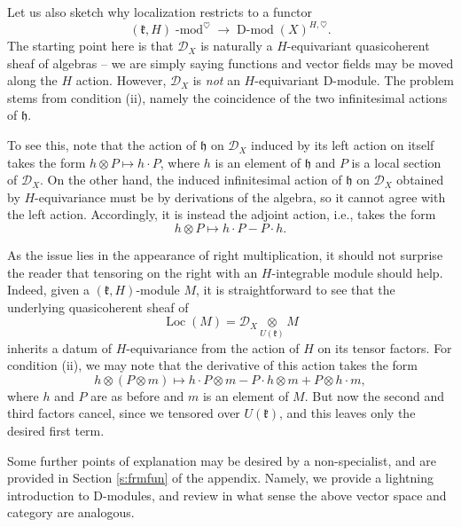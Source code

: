 \documentclass[10pt]{amsart}
\newcommand{\sB}{\on{Fl}_G}
\newcommand{\fh}{\mathfrak{h}}
\newcommand{\on}{\operatorname}
\renewcommand{\mod}{\on{-mod}}
\newcommand{\Dmod}{\on{D-mod}}
\theoremstyle{remark}
\newcommand{\fk}{\mathfrak{k}}
\newcommand{\CC}{\mathbb{C}}
\newcommand{\OO}{\mathscr{O}}
\newcommand{\sD}{\mathscr{D}}
\numberwithin{equation}{section}
\renewcommand{\mod}{\operatorname{-mod}}
\begin{document}
	Let us also sketch why localization restricts to a functor 
	\[
	   (\fk, H)\mod^\heartsuit \rightarrow \Dmod(X)^{H, \heartsuit}.
	\]
	The starting point here is that $\sD_X$ is naturally a $H$-equivariant 
	quasicoherent sheaf of algebras -- we are simply saying functions and vector 
	fields may be moved along the $H$ action. However, $\sD_X$ is {\em not} an 
	$H$-equivariant D-module. The problem stems from condition (ii), namely the 
	coincidence of the two infinitesimal actions of $\fh$. 
	
	To see this, note 
	that the action of $\fh$ on $\sD_X$ induced by its left action on itself 
	takes the form $h \otimes P \mapsto h \cdot P$, where $h$ is an element of 
	$\fh$ 
	and $P$ is a local section of $\sD_X$. On the other hand, the induced 
	infinitesimal action of $\fh$ on $\sD_X$ obtained by $H$-equivariance must 
	be by 
	derivations of the algebra, so it cannot agree with the left action. Accordingly, it is instead the adjoint 
	action, i.e., takes the form 
	\[
	     h \otimes P \mapsto h\cdot P - P\cdot h.
	\]



      As the issue lies in the appearance of right multiplication, it should 
      not surprise the reader that tensoring on the right with an 
      $H$-integrable module should help. Indeed, given a $(\fk, H)$-module 
      $M$, it is straightforward to see that the underlying quasicoherent sheaf 
      of $$\on{Loc}(M) = \sD_X \underset{U(\fk)} \otimes M$$inherits a datum of 
      $H$-equivariance from the action of $H$ on its tensor factors. For 
      condition (ii), we may note that the derivative of this action takes the 
      form
      \[
          h \otimes (P \otimes m) \mapsto h \cdot P \otimes m - P \cdot h 
          \otimes m + P \otimes h \cdot m,
      \] 
%
where $h$ and $P$ are as before and $m$ is an element of $M$. But now the 
second and third factors cancel, since we tensored over $U(\fk)$, and this 
leaves only the desired first term. 

	
	
	

	
	
	
	
	
	
	
	
	\iffalse
	
	Some further points of explanation may be desired by a non-specialist, and 
	are provided in Section \ref{s:frmfun} of the appendix. Namely, we  provide 
	a lightning introduction to D-modules, and review in what sense the above 
	vector space and category are analogous. 
	
\end{document}
